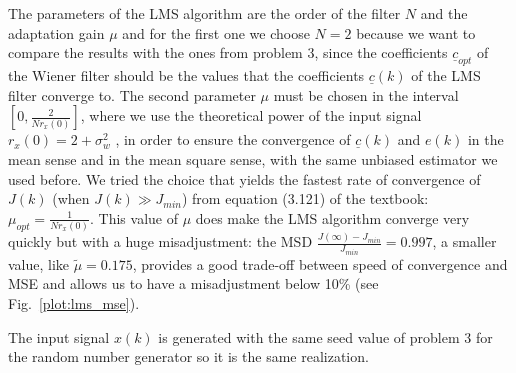 \documentclass{article}
\renewcommand{\vec}[1]{\underline{#1}}
\newcommand{\E}[1]{\operatorname{E}\left[#1\right]}
\newcommand{\norm}[1]{\left\lVert#1\right\rVert}
\newcommand{\abs}[1]{\left|#1\right|}
\begin{document}
The parameters of the LMS algorithm are the order of the filter $N$
and the adaptation gain $\mu$ and for the first one we choose $N = 2$
because we want to compare the results with the ones from problem 3,
since the coefficients $\vec{c}_{opt}$ of the Wiener filter should be
the values that the coefficients $\vec{c}(k)$ of the LMS filter
converge to.  The second parameter $\mu$ must be chosen in the
interval $\left[0,\frac{2}{Nr_x(0)}\right]$, where we use the
theoretical power of the input signal $r_x(0) = 2 + \sigma^2_w$ , in
order to ensure the convergence of $\vec{c}(k)$ and $e(k)$ in the mean
sense and in the mean square sense,
with the same unbiased estimator we used before.  We tried the choice
that yields the fastest rate of convergence of $J(k)$ (when $J(k) \gg
J_{min}$) from equation (3.121) of the textbook: $\mu_{opt} =
\frac{1}{Nr_x(0)}$. This value of $\mu$ does make the LMS algorithm
converge very quickly but with a huge misadjustment: the MSD
$\frac{J(\infty) - J_{min}}{J_{min}} = 0.997$, a smaller value, like
$\tilde{\mu} = 0.175$, provides a good trade-off between speed of
convergence and MSE and allows us to have a misadjustment below 10\%
(see Fig.~\ref{plot:lms_mse}).

The input signal $x(k)$ is generated with the same seed value of
problem 3 for the random number generator so it is the same
realization.
\end{document}
